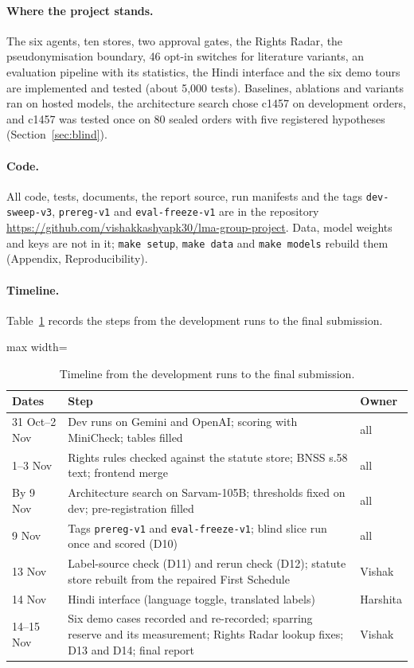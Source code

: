 \paragraph{Where the project stands.} The six agents, ten stores, two approval gates, the Rights Radar, the pseudonymisation boundary, 46 opt-in switches for literature variants, an evaluation pipeline with its statistics, the Hindi interface and the six demo tours are implemented and tested (about 5,000 tests). Baselines, ablations and variants ran on hosted models, the architecture search chose c1457 on development orders, and c1457 was tested once on 80 sealed orders with five registered hypotheses (Section~\ref{sec:blind}).

\paragraph{Code.} All code, tests, documents, the report source, run manifests and the tags \texttt{dev-sweep-v3}, \texttt{prereg-v1} and \texttt{eval-freeze-v1} are in the repository \url{https://github.com/vishakkashyapk30/lma-group-project}. Data, model weights and keys are not in it; \texttt{make setup}, \texttt{make data} and \texttt{make models} rebuild them (Appendix, Reproducibility).

\paragraph{Timeline.} Table~\ref{tab:timeline} records the steps from the development runs to the final submission.

\begin{table}[!t]
\centering\small
\begin{adjustbox}{max width=\textwidth}
\begin{tabular}{@{}p{1.5cm}p{4.2cm}p{1.2cm}@{}}
\toprule
Dates & Step & Owner \\
\midrule
31 Oct--2 Nov & Dev runs on Gemini and OpenAI; scoring with MiniCheck; tables filled & all \\
1--3 Nov & Rights rules checked against the statute store; BNSS s.58 text; frontend merge & all \\
By 9 Nov & Architecture search on Sarvam-105B; thresholds fixed on dev; pre-registration filled & all \\
9 Nov & Tags \texttt{prereg-v1} and \texttt{eval-freeze-v1}; blind slice run once and scored (D10) & all \\
13 Nov & Label-source check (D11) and rerun check (D12); statute store rebuilt from the repaired First Schedule & Vishak \\
14 Nov & Hindi interface (language toggle, translated labels) & Harshita \\
14--15 Nov & Six demo cases recorded and re-recorded; sparring reserve and its measurement; Rights Radar lookup fixes; D13 and D14; final report & Vishak \\
\bottomrule
\end{tabular}
\end{adjustbox}
\caption{Timeline from the development runs to the final submission.}
\label{tab:timeline}
\end{table}
